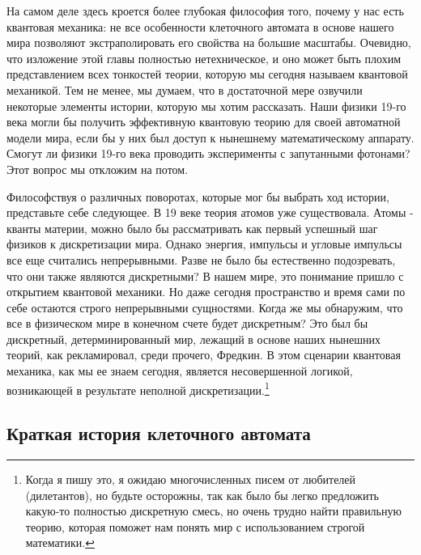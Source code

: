 \documentclass[main.tex]{subfiles}
\begin{document}
На самом деле здесь кроется более глубокая философия того, почему у нас есть квантовая механика: не все особенности клеточного автомата в основе нашего мира позволяют экстраполировать его свойства на большие масштабы. Очевидно, что изложение этой главы полностью нетехническое, и оно может быть плохим представлением всех тонкостей теории, которую мы сегодня называем квантовой механикой. Тем не менее, мы думаем, что в достаточной мере озвучили некоторые элементы истории, которую мы хотим рассказать. Наши физики 19-го века могли бы получить эффективную квантовую теорию для своей автоматной модели мира, если бы у них был доступ к нынешнему математическому аппарату. Смогут ли физики 19-го века проводить эксперименты с запутанными фотонами? Этот вопрос мы откложим на потом. 

Философствуя о различных поворотах, которые мог бы выбрать ход истории, представьте себе следующее. В 19 веке теория атомов уже существовала. Атомы - кванты материи, можно было бы рассматривать как первый успешный шаг физиков к дискретизации мира. Однако энергия, импульсы и угловые импульсы все еще считались непрерывными. Разве не было бы естественно подозревать, что они также являются дискретными? В нашем мире, это понимание пришло с открытием квантовой механики. Но даже сегодня пространство и время сами по себе остаются строго непрерывными сущностями. Когда же мы обнаружим, что все в физическом мире в конечном счете будет дискретным? Это был бы дискретный, детерминированный мир, лежащий в основе наших нынешних теорий, как рекламировал, среди прочего, Фредкин. В этом сценарии квантовая механика, как мы ее знаем сегодня, является несовершенной логикой, возникающей в результате неполной дискретизации.\footnote{Когда я пишу это, я ожидаю многочисленных писем от любителей (дилетантов), но будьте осторожны, так как было бы легко предложить какую-то полностью дискретную смесь, но очень трудно найти правильную теорию, которая поможет нам понять мир с использованием строгой математики.}

\subsection{Краткая история клеточного автомата}\label{ch1.4}
\end{document}

